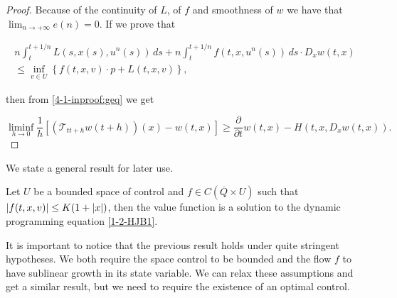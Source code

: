 \begin{proof}
    Because of the continuity of $L$, of $f$ and smoothness of $w$ we have that $\lim_{n\to+\infty}e(n)=0$. If we prove that

    \begin{equation}\label{miao}
        \begin{aligned}
            n\int_t^{t+1/n} L(s,x(s),u^n(s))\,ds + n\int_t^{t+1/n} f(t,x,u^n(s))\,ds \cdot D_x w(t,x) \\
            \leq \inf_{v\in U}\left\{f(t,x,v)\cdot p + L(t,x,v)\right\},
        \end{aligned}
    \end{equation}  

    then from \ref{4-1-inproof:geq} we get

    \[\liminf_{h\to0}\frac{1}{h}\left[\left(\mathcal{T}_{tt+h}w\left(t+h\right)\right)(x) - w(t,x)\right] \geq \frac{\partial}{\partial t}w(t,x) - H(t,x,D_x w(t,x)).\]
 


\end{proof}

We state a general result for later use.

\begin{corollary}\label{3-4-Coroll: Continuous V implies solution}
    Let $U$ be a bounded space of control and $f\in C(\overline{Q}\times U)$ such that $\abs{f(t,x,v)}\leq K(1+\abs{x})$, then the value 
    function is a solution to the dynamic programming equation \ref{1-2-HJB1}.
\end{corollary}

It is important to notice that the previous result holds under quite stringent hypotheses. We both require the space control to be bounded and the flow $f$ to have sublinear growth in its state variable. We can relax these assumptions 
and get a similar result, but we need to require the existence of an optimal control.

